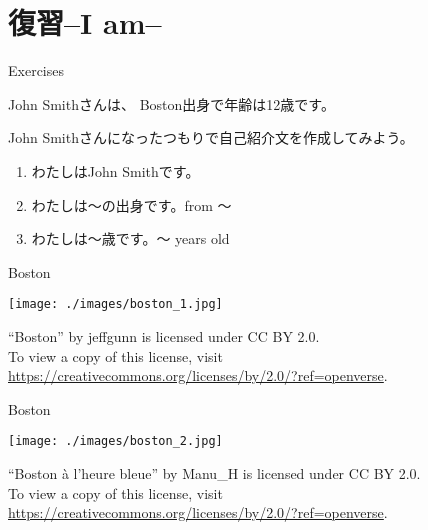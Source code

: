 \documentclass[aspectratio=169,xcolor={dvipsnames,table}]{beamer}
\begin{document}
\section*{復習--I am--}
\begin{frame}[plain]{Exercises}

John Smithさんは、
Boston出身で年齢は12歳です。

John Smithさんになったつもりで自己紹介文を作成してみよう。

\begin{enumerate}
 \item わたしはJohn Smithです。
 \item わたしは〜の出身です。\hfill{}from 〜
 \item わたしは〜歳です。\hfill{}〜 years old
\end{enumerate}

\end{frame}

\begin{frame}[plain]{Boston}

\raggedleft

\texttt{[image: ./images/boston\_1.jpg]}

\vspace*{-8pt}
\tiny

``Boston'' by jeffgunn is licensed under CC BY 2.0. \\
To view a copy of this license, visit \url{https://creativecommons.org/licenses/by/2.0/?ref=openverse}.
  \end{frame}

\begin{frame}[plain]{Boston}

\raggedleft

\texttt{[image: ./images/boston\_2.jpg]}

\vspace*{-8pt}
\tiny


``Boston \`{a} l'heure bleue'' by Manu\_H is licensed under CC BY 2.0.\\
To view a copy of this license, visit \url{https://creativecommons.org/licenses/by/2.0/?ref=openverse}.

 \end{frame}

\end{document}

